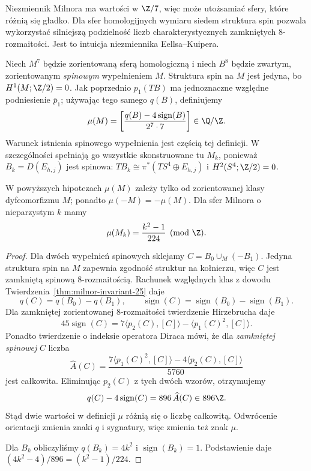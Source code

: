 Niezmiennik Milnora ma wartości w $\Z/7$,
więc może utożsamiać sfery, które różnią
się gładko. Dla sfer homologijnych wymiaru
siedem struktura spin pozwala wykorzystać
silniejszą podzielność liczb
charakterystycznych zamkniętych
$8$-rozmaitości. Jest to intuicja
niezmiennika Eellsa--Kuipera.

Niech $M^7$ będzie zorientowaną sferą
homologiczną i niech $B^8$ będzie zwartym,
zorientowanym \emph{spinowym} wypełnieniem
$M$. Struktura spin na $M$ jest jedyna,
bo $H^1(M;\Z/2)=0$. Jak poprzednio
$p_1(TB)$ ma jednoznaczne względne
podniesienie $\bar p_1$; używając
tego samego $q(B)$, definiujemy
\[
 \mu(M)=
 \left[\frac{q(B)-4\operatorname{sign}(B)}
                 {2^7\cdot7}\right]\in\Q/\Z.
\]
Warunek istnienia spinowego wypełnienia
jest częścią tej definicji. W szczególności
spełniają go wszystkie skonstruowane tu
$M_k$, ponieważ $B_k=D(E_{h,j})$ jest
spinowa: $TB_k\cong
\pi^*(TS^4\oplus E_{h,j})$ i
$H^2(S^4;\Z/2)=0$.

\begin{stwierdzenie}
\label{prop:eells-kuiper-Milnor-25}
W powyższych hipotezach $\mu(M)$ zależy
tylko od zorientowanej klasy
dyfeomorfizmu $M$; ponadto
$\mu(-M)=-\mu(M)$.
Dla sfer Milnora o nieparzystym $k$ mamy
\[
 \mu(M_k)=\frac{k^2-1}{224}\pmod{\Z}.
\]
\end{stwierdzenie}
\begin{proof}
Dla dwóch wypełnień spinowych sklejamy
$C=B_0\cup_M(-B_1)$. Jedyna struktura
spin na $M$ zapewnia zgodność struktur
na kołnierzu, więc $C$ jest zamkniętą
spinową $8$-rozmaitością.
Rachunek względnych klas z dowodu
Twierdzenia~\ref{thm:milnor-invariant-25}
daje
\[
 q(C)=q(B_0)-q(B_1),\qquad
 \operatorname{sign}(C)=
 \operatorname{sign}(B_0)
 -\operatorname{sign}(B_1).
\]
Dla zamkniętej zorientowanej
$8$-rozmaitości twierdzenie Hirzebrucha
daje
\[
 45\operatorname{sign}(C)
   =7\langle p_2(C),[C]\rangle
      -\langle p_1(C)^2,[C]\rangle.
\]
Ponadto twierdzenie o indeksie operatora
Diraca mówi, że dla \emph{zamkniętej
spinowej} $C$ liczba
\[
 \widehat A(C)=
 \frac{7\langle p_1(C)^2,[C]\rangle
       -4\langle p_2(C),[C]\rangle}
      {5760}
\]
jest całkowita. Eliminując $p_2(C)$
z tych dwóch wzorów, otrzymujemy
\[
 q(C)-4\operatorname{sign}(C)
   =896\,\widehat A(C)\in896\Z.
\]
Stąd dwie wartości w definicji $\mu$
różnią się o liczbę całkowitą.
Odwrócenie orientacji zmienia znaki
$q$ i sygnatury, więc zmienia też
znak $\mu$.

Dla $B_k$ obliczyliśmy
$q(B_k)=4k^2$ i
$\operatorname{sign}(B_k)=1$.
Podstawienie daje
$(4k^2-4)/896=(k^2-1)/224$.
\end{proof}

